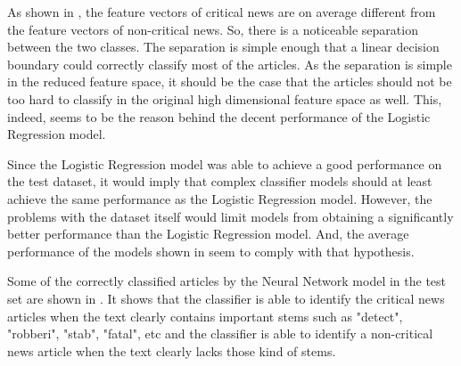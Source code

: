 As shown in , the feature vectors of critical news are on average different from the feature vectors of non-critical news. So, there is a noticeable separation between the two classes. The separation is simple enough that a linear decision boundary could correctly classify most of the articles. As the separation is simple in the reduced feature space, it should be the case that the articles should not be too hard to classify in the original high dimensional feature space as well. This, indeed, seems to be the reason behind the decent performance of the Logistic Regression model.

Since the Logistic Regression model was able to achieve a good performance on the test dataset, it would imply that complex classifier models should at least achieve the same performance as the Logistic Regression model. However, the problems with the dataset itself would limit models from obtaining a significantly better performance than the Logistic Regression model. And, the average performance of the models shown in  seem to comply with that hypothesis.

Some of the correctly classified articles by the Neural Network model in the test set are shown in . It shows that the classifier is able to identify the critical news articles when the text clearly contains important stems such as "detect", "robberi", "stab", "fatal", etc and the classifier is able to identify a non-critical news article when the text clearly lacks those kind of stems.

